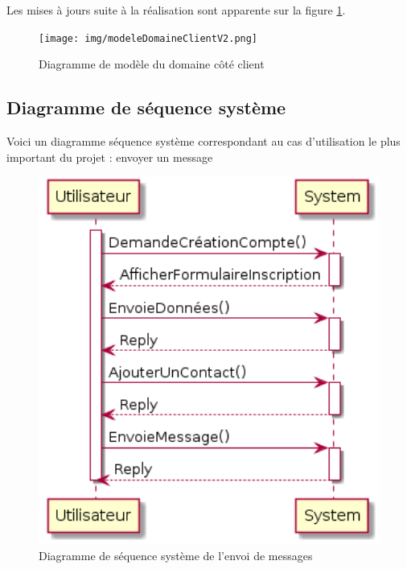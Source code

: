 		Les mises à jours suite à la réalisation sont apparente sur la figure \ref{modeleDomaineClient}.
	\begin{figure}[H]
		\centerline{\texttt{[image: img/modeleDomaineClientV2.png]}}
		\caption{Diagramme de modèle du domaine côté client}
		\label{modeleDomaineClient}
	\end{figure}

	\newpage

	\subsection{Diagramme de séquence système}
	
	
	Voici un diagramme séquence système correspondant au cas d'utilisation le plus important du projet : envoyer un message
	\begin{figure}[H]
		\centerline{\includegraphics[width=12.5cm]{img/sequenceSystemeEnvoiMessage.png}}
		\caption{Diagramme de séquence système de l'envoi de messages}
	\end{figure}

	\newpage

